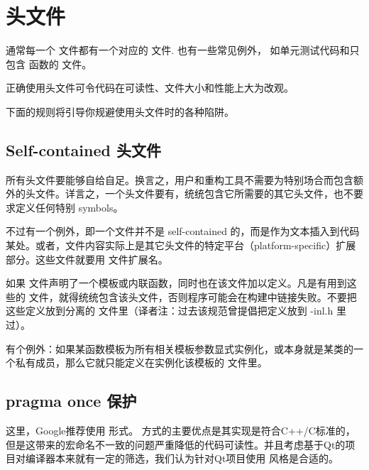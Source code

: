 \chapter{头文件}

通常每一个  文件都有一个对应的  文件. 也有一些常见例外， 如单元测试代码和只包含  函数的 文件。

正确使用头文件可令代码在可读性、文件大小和性能上大为改观。

下面的规则将引导你规避使用头文件时的各种陷阱。

\section{Self-contained 头文件}


所有头文件要能够自给自足。换言之，用户和重构工具不需要为特别场合而包含额外的头文件。详言之，一个头文件要有，统统包含它所需要的其它头文件，也不要求定义任何特别 symbols。

不过有一个例外，即一个文件并不是 self-contained 的，而是作为文本插入到代码某处。或者，文件内容实际上是其它头文件的特定平台（platform-specific）扩展部分。这些文件就要用 文件扩展名。

如果  文件声明了一个模板或内联函数，同时也在该文件加以定义。凡是有用到这些的  文件，就得统统包含该头文件，否则程序可能会在构建中链接失败。不要把这些定义放到分离的  文件里（译者注：过去该规范曾提倡把定义放到 -inl.h 里过）。

有个例外：如果某函数模板为所有相关模板参数显式实例化，或本身就是某类的一个私有成员，那么它就只能定义在实例化该模板的  文件里。

\section{pragma once 保护} \label{pragma-once-guard}


\begin{DWarn}
	这里，Google推荐使用  形式。  方式的主要优点是其实现是符合C++/C标准的，但是这带来的宏命名不一致的问题严重降低的代码可读性。并且考虑基于Qt的项目对编译器本来就有一定的筛选，我们认为针对Qt项目使用  风格是合适的。
\end{DWarn}

